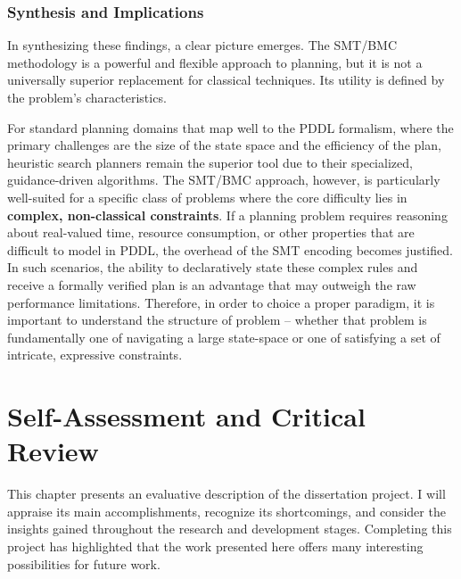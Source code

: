 \documentclass[12pt, a4paper, oneside]{report} %
\begin{document}
\subsection*{Synthesis and Implications}

In synthesizing these findings, a clear picture emerges. The SMT/BMC methodology is a powerful and flexible approach to planning, but it is not a universally superior replacement for classical techniques. Its utility is defined by the problem's characteristics.

For standard planning domains that map well to the PDDL formalism, where the primary challenges are the size of the state space and the efficiency of the plan, heuristic search planners remain the superior tool due to their specialized, guidance-driven algorithms. The SMT/BMC approach, however, is particularly well-suited for a specific class of problems where the core difficulty lies in \textbf{complex, non-classical constraints}. If a planning problem requires reasoning about real-valued time, resource consumption, or other properties that are difficult to model in PDDL, the overhead of the SMT encoding becomes justified. In such scenarios, the ability to declaratively state these complex rules and receive a formally verified plan is an advantage that may outweigh the raw performance limitations. Therefore, in order to choice a proper paradigm, it is important to understand the structure of problem -- whether that problem is fundamentally one of navigating a large state-space or one of satisfying a set of intricate, expressive constraints.

\chapter{Self-Assessment and Critical Review}
\label{chap:assessment}
This chapter presents an evaluative description of the dissertation project. I will appraise its main accomplishments, recognize its shortcomings, and consider the insights gained throughout the research and development stages. Completing this project has highlighted that the work presented here offers many interesting possibilities for future work.
\end{document}
